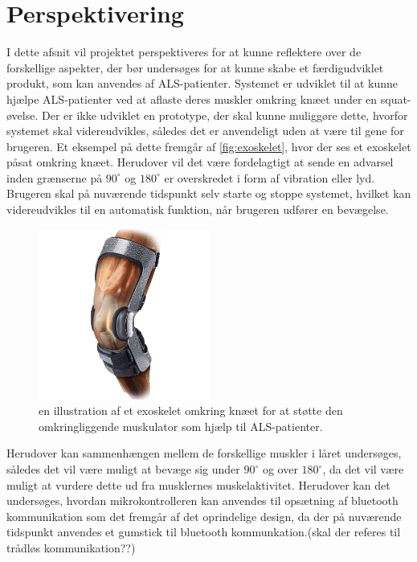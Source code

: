 \section{Perspektivering} \label{perspektivering}
I dette afsnit vil projektet perspektiveres for at kunne reflektere over de forskellige aspekter, der bør undersøges for at kunne skabe et færdigudviklet produkt, som kan anvendes af ALS-patienter. Systemet er udviklet til at kunne hjælpe ALS-patienter ved at aflaste deres muskler omkring knæet under en squat-øvelse. Der er ikke udviklet en prototype, der skal kunne muliggøre dette, hvorfor systemet skal videreudvikles, således det er anvendeligt uden at være til gene for brugeren. Et eksempel på dette fremgår af \autoref{fig:exoskelet}, hvor der ses et exoskelet påsat omkring knæet. Herudover vil det være fordelagtigt at sende en advarsel inden grænserne på $90^{\circ}$ og $180^{\circ}$ er overskredet i form af vibration eller lyd. Brugeren skal på nuværende tidspunkt selv starte og stoppe systemet, hvilket kan videreudvikles til en automatisk funktion, når brugeren udfører en bevægelse. 

\begin{figure}[H]
\centering
\includegraphics[width=0.5\textwidth]{figures/exoskelet}
\caption{en illustration af et exoskelet omkring knæet for at støtte den omkringliggende muskulator som hjælp til ALS-patienter.}
\label{fig:exoskelet}
\end{figure}

\noindent
Herudover kan sammenhængen mellem de forskellige muskler i låret undersøges, således det vil være muligt at bevæge sig under $90^{\circ}$ og over $180^{\circ}$, da det vil være muligt at vurdere dette ud fra musklernes muskelaktivitet. Herudover kan det undersøges, hvordan mikrokontrolleren kan anvendes til opsætning af bluetooth kommunikation som det fremgår af det oprindelige design, da der på nuværende tidspunkt anvendes et gumstick til bluetooth kommunkation.(skal der referes til trådløs kommunikation??)

